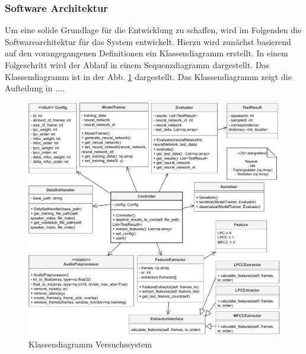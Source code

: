 \subsubsection{Software Architektur}
Um eine solide Grundlage für die Entwicklung zu schaffen, wird im Folgenden die Softwarearchitektur für das System entwickelt.
Hierzu wird zunächst basierend auf den vorangegangenen Definitionen ein Klassendiagramm erstellt.
In einem Folgeschritt wird der Ablauf in einem Sequenzdiagramm dargestellt. %
\newparagraph
Das Klassendiagramm ist in der Abb. \ref{fig:klassendiagram-versuchssystem} dargestellt.
Das Klassendiagramm zeigt die Aufteilung in ....
\begin{figure}[H]
    \centering
    \includegraphics[width=\textwidth, keepaspectratio]{images/klassendiagram-versuchssystem.pdf}
    \caption{Klassendiagramm Versuchssystem}
    \label{fig:klassendiagram-versuchssystem}
\end{figure}\noindent

